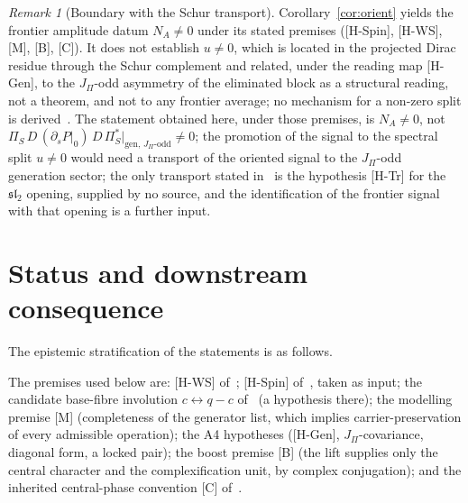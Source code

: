 \documentclass[11pt]{article}
\theoremstyle{definition}
\theoremstyle{remark}
\newtheorem{remark}{Remark}
\begin{document}
    \begin{remark}[Boundary with the Schur transport]
      Corollary~\ref{cor:orient} yields the frontier amplitude datum $N_A\neq0$ under its stated premises ([H-Spin], [H-WS],
[M], [B], [C]).
      It does not establish $u\neq0$, which is located in the projected Dirac residue through the Schur complement and
      related, under the reading map [H-Gen], to the $J_\Pi$-odd asymmetry of the eliminated block as a structural
      reading, not a theorem, and not to any frontier average; no mechanism for a non-zero split is derived~\cite{Beau2026prs}.
      The statement obtained here, under those premises, is $N_A\neq0$, not
      $\Pi_S\,D\,(\partial_s P|_0)\,D\,\Pi_S^{*}\big|_{\mathrm{gen},\,J_\Pi\text{-odd}}\neq0$; the promotion of the
      signal to the spectral split $u\neq0$ would need a transport of the oriented signal to the $J_\Pi$-odd generation
      sector; the only transport stated in~\cite{Beau2026prs} is the hypothesis [H-Tr] for the $\mathfrak{sl}_2$ opening,
      supplied by no source, and the identification of the frontier signal with that opening is a further input.
    \end{remark}

  \section{Status and downstream consequence}
    \label{sec:status}

    The epistemic stratification of the statements is as follows.

    The premises used below are: [H-WS] of~\cite{Beau2026q11of}; [H-Spin] of~\cite{Beau2026q14}, taken as input; the
    candidate base-fibre involution $c\leftrightarrow q-c$ of~\cite{Beau2026m} (a hypothesis there); the
    modelling premise [M] (completeness of the generator list, which implies carrier-preservation of every admissible
    operation); the A4 hypotheses ([H-Gen], $J_\Pi$-covariance, diagonal form, a locked pair); the boost premise [B] (the lift
supplies only the central character and the complexification unit, by complex conjugation); and the inherited
central-phase convention [C] of~\cite{Beau2026cho}.
\end{document}
